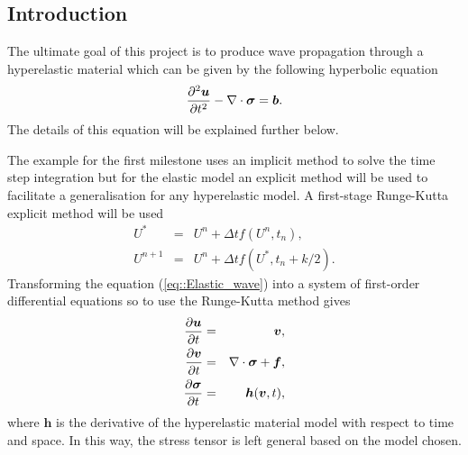 \subsection{Introduction}
The ultimate goal of this project is to produce wave propagation through a hyperelastic material which can be given by the following hyperbolic equation
\begin{equation}
  \label{eq::Elastic_wave}
  \frac{\partial^2 \bm{u}}{\partial t^2} - \nabla\cdot \bm{\sigma} = \bm{b}.
\end{equation}
The details of this equation will be explained further below.

The example for the first milestone uses an implicit method to solve the time step integration but for the elastic model an explicit method will be used to facilitate a generalisation for any hyperelastic model. A first-stage Runge-Kutta explicit method will be used
\begin{eqnarray*}
  U^* & = & U^n + \Delta tf(U^n,t_n), \\
  U^{n+1} & = & U^n + \Delta tf(U^*,t_n+k/2).
\end{eqnarray*}
Transforming the equation (\ref{eq::Elastic_wave}) into a system of first-order differential equations so to use the Runge-Kutta method gives
\begin{eqnarray*}
  \frac{\partial \bm{u}}{\partial t} & = & \bm{v}, \\
  \frac{\partial \bm{v}}{\partial t} & = & \nabla\cdot\bm{\sigma} + \bm{f}, \\
  \frac{\partial \bm{\sigma}}{\partial t} & = & \bm{h}(\bm{v},t),
\end{eqnarray*}
where $\bm{h}$ is the derivative of the hyperelastic material model with respect to time and space. In this way, the stress tensor is left general based on the model chosen.
